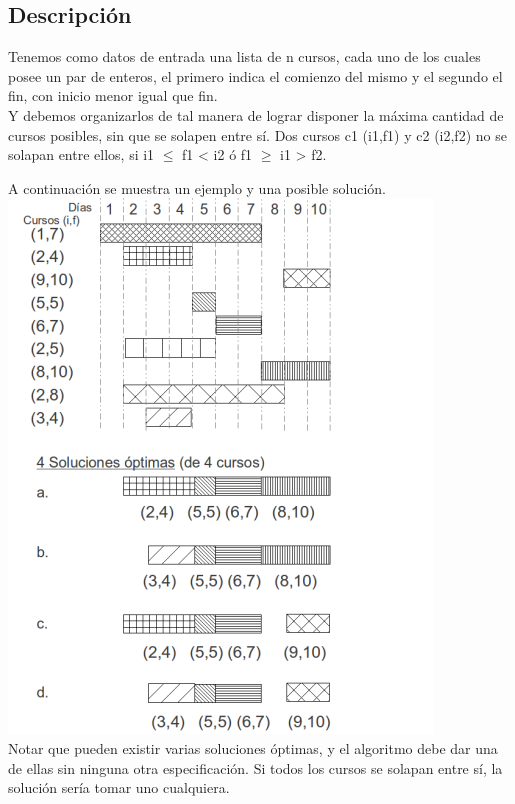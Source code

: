 \subsection{Descripci\'on}
Tenemos como datos de entrada una lista de n cursos, cada uno de los cuales posee un par de enteros, el primero indica el comienzo del mismo y el segundo el fin, con inicio menor igual que fin. \\
Y debemos organizarlos de tal manera de lograr disponer la máxima cantidad de cursos posibles, sin que se solapen entre sí. Dos cursos c1 (i1,f1) y c2 (i2,f2) no se solapan entre ellos, si i1 $\leq$ f1 <  i2  ó f1 $\geq$ i1 > f2.

A continuación se muestra un ejemplo y una posible solución.\\

\includegraphics[scale=1]{ej2/Graficos/ej2a400x480.png} \\

Notar que pueden existir varias soluciones óptimas, y el algoritmo debe dar una de ellas sin ninguna otra especificación. Si todos los cursos se solapan entre sí, la solución sería tomar uno cualquiera.\\

